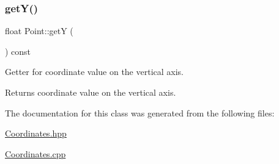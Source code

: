 \subsubsection{\texorpdfstring{get\+Y()}{getY()}}
{\footnotesize\ttfamily float Point\+::getY (\begin{DoxyParamCaption}{ }\end{DoxyParamCaption}) const}

Getter for coordinate value on the vertical axis.

\begin{DoxyReturn}{Returns}
coordinate value on the vertical axis. 
\end{DoxyReturn}


The documentation for this class was generated from the following files\+:\begin{DoxyCompactItemize}
\item 
\hyperlink{_coordinates_8hpp}{Coordinates.\+hpp}\item 
\hyperlink{_coordinates_8cpp}{Coordinates.\+cpp}\end{DoxyCompactItemize}

